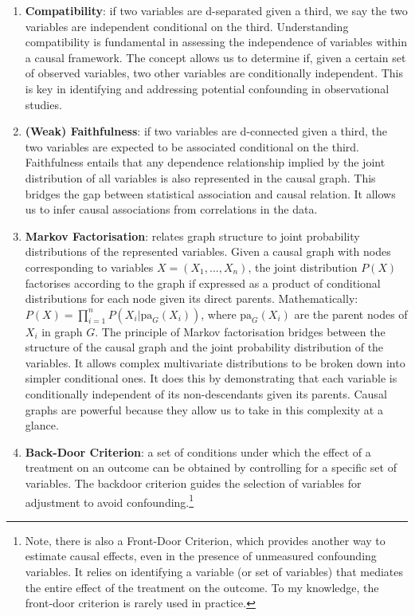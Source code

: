\documentclass[
  singlecolumn]{report}
\begin{document}
\begin{enumerate}
\def\labelenumi{\arabic{enumi}.}
\setcounter{enumi}{7}
\item
  \textbf{Compatibility}: if two variables are d-separated given a
  third, we say the two variables are independent conditional on the
  third. Understanding compatibility is fundamental in assessing the
  independence of variables within a causal framework. The concept
  allows us to determine if, given a certain set of observed variables,
  two other variables are conditionally independent. This is key in
  identifying and addressing potential confounding in observational
  studies.
\item
  \textbf{(Weak) Faithfulness}: if two variables are d-connected given a
  third, the two variables are expected to be associated conditional on
  the third. Faithfulness entails that any dependence relationship
  implied by the joint distribution of all variables is also represented
  in the causal graph. This bridges the gap between statistical
  association and causal relation. It allows us to infer causal
  associations from correlations in the data.
\item
  \textbf{Markov Factorisation}: relates graph structure to joint
  probability distributions of the represented variables. Given a causal
  graph with nodes corresponding to variables \(X = (X_1, ..., X_n)\),
  the joint distribution \(P(X)\) factorises according to the graph if
  expressed as a product of conditional distributions for each node
  given its direct parents. Mathematically:
  \(P(X) = \prod_{i=1}^{n} P(X_i | \text{pa}_G(X_i))\), where
  \(\text{pa}_G(X_i)\) are the parent nodes of \(X_i\) in graph \(G\).
  The principle of Markov factorisation bridges between the structure of
  the causal graph and the joint probability distribution of the
  variables. It allows complex multivariate distributions to be broken
  down into simpler conditional ones. It does this by demonstrating that
  each variable is conditionally independent of its non-descendants
  given its parents. Causal graphs are powerful because they allow us to
  take in this complexity at a glance.
\item
  \textbf{Back-Door Criterion}: a set of conditions under which the
  effect of a treatment on an outcome can be obtained by controlling for
  a specific set of variables. The backdoor criterion guides the
  selection of variables for adjustment to avoid confounding.\footnote{Note,
    there is also a Front-Door Criterion, which provides another way to
    estimate causal effects, even in the presence of unmeasured
    confounding variables. It relies on identifying a variable (or set
    of variables) that mediates the entire effect of the treatment on
    the outcome. To my knowledge, the front-door criterion is rarely
    used in practice.}
\end{enumerate}
\end{document}

